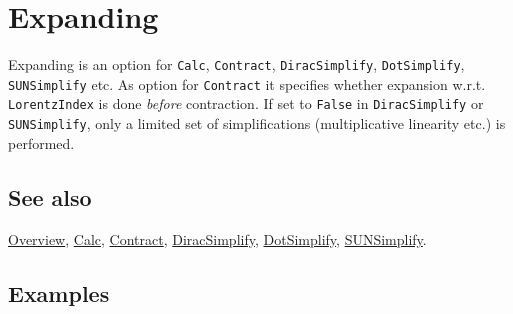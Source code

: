 \documentclass[../FeynCalcManual.tex]{subfiles}
\begin{document}
\hypertarget{expanding}{%
\section{Expanding}\label{expanding}}

Expanding is an option for \texttt{Calc}, \texttt{Contract},
\texttt{DiracSimplify}, \texttt{DotSimplify}, \texttt{SUNSimplify} etc.
As option for \texttt{Contract} it specifies whether expansion w.r.t.
\texttt{LorentzIndex} is done \emph{before} contraction. If set to
\texttt{False} in \texttt{DiracSimplify} or \texttt{SUNSimplify}, only a
limited set of simplifications (multiplicative linearity etc.) is
performed.

\subsection{See also}

\hyperlink{toc}{Overview}, \hyperlink{calc}{Calc},
\hyperlink{contract}{Contract},
\hyperlink{diracsimplify}{DiracSimplify},
\hyperlink{dotsimplify}{DotSimplify},
\hyperlink{sunsimplify}{SUNSimplify}.

\subsection{Examples}
\end{document}
